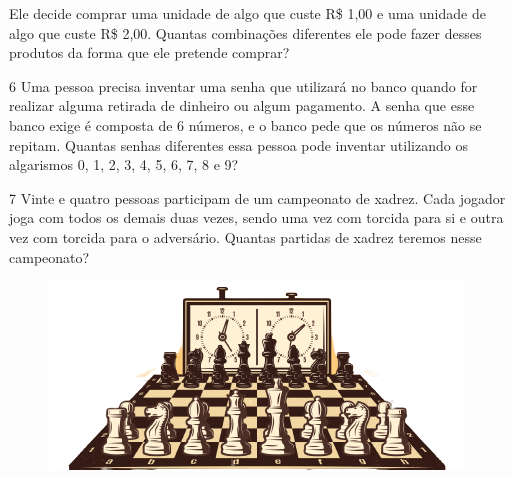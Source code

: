 Ele decide comprar uma unidade de algo que custe R\$ 1,00 e uma unidade de
algo que custe R\$ 2,00. Quantas combinações diferentes ele pode fazer
desses produtos da forma que ele pretende comprar?


\num{6} Uma pessoa precisa inventar uma senha que utilizará no banco quando for
realizar alguma retirada de dinheiro ou algum pagamento. A senha que esse
banco exige é composta de 6 números, e o banco pede que os números
não se repitam. Quantas senhas diferentes essa pessoa pode inventar
utilizando os algarismos 0, 1, 2, 3, 4, 5, 6, 7, 8 e 9?


\num{7} Vinte e quatro pessoas participam de um campeonato de xadrez. Cada jogador joga com todos os demais duas vezes, sendo uma vez com
torcida para si e outra vez com torcida para o adversário. Quantas partidas
de xadrez teremos nesse campeonato?

\begin{figure}[htpb!]
\centering
\includegraphics[width=.6\textwidth]{media/image73a.png}
\end{figure}


